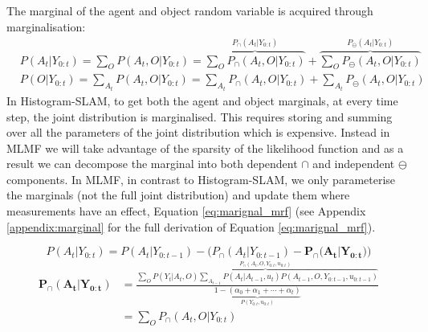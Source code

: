 The marginal of the agent and object random variable is acquired through marginalisation:
\begin{align}
  &P(A_t|Y_{0:t}) = \sum\limits_{O}   P(A_t,O|Y_{0:t}) = \overbrace{\sum\limits_{O} P_{\cap}(A_t,O|Y_{0:t})}^{P_{\cap}(A_t|Y_{0:t})} + \overbrace{\sum\limits_{O} P_{\ominus}(A_t,O|Y_{0:t})}^{P_{\ominus}(A_t|Y_{0:t})}   \nonumber \\
  &P(O|Y_{0:t})   = \sum\limits_{A_t} P(A_t,O|Y_{0:t}) = \sum\limits_{A_t} P_{\cap}(A_t,O|Y_{0:t}) + \sum\limits_{A_t} P_{\ominus}(A_t,O|Y_{0:t})\nonumber
\end{align}
In Histogram-SLAM, to get both the agent and object marginals, at every time step, the joint distribution is marginalised.
This requires storing and summing over all the parameters of the joint distribution which is expensive. Instead in MLMF 
we will take advantage of the sparsity of the likelihood function and as a result we can decompose the marginal into both 
dependent $\cap$ and independent $\ominus$ components. In MLMF, in contrast to Histogram-SLAM, we only parameterise
the marginals (not the full joint distribution) and update them where measurements have an effect,  Equation \ref{eq:marignal_mrf}
(see Appendix \ref{appendix:marginal} for the full derivation of Equation \ref{eq:marignal_mrf}).

\begin{equation}
 P(A_t|Y_{0:t})  =  P(A_t|Y_{0:t-1}) - \Big(P_{\cap}(A_t|Y_{0:t-1}) -  \mathbf{P_{\cap}(A_t|Y_{0:t}})  \Big) \label{eq:marignal_mrf} 
\end{equation}
\begin{align}\label{eq:marignal_mrf_2}
 \mathbf{P_{\cap}(A_t|Y_{0:t})} &= \frac{ \sum\limits_{O} \overbrace{ P(Y_t|A_{t},O)  \sum_{A_{t-1}} P(A_t|A_{t-1},u_t)  P(A_{t-1},O,Y_{0:t-1},u_{0:t-1})  }^{P_{\cap}(A_t,O,Y_{0:t},u_{0:t})}}{\underbrace{1  - (\alpha_{0} + \alpha_{1} + \cdots + \alpha_{t})}_{P(Y_{0:t},u_{0:t})}} \\
		       &= \sum\limits_{O} P_{\cap}(A_t,O|Y_{0:t})
\end{align}

